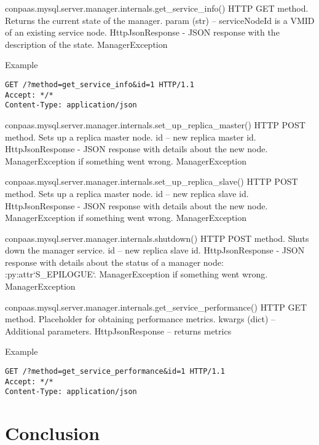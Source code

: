 \documentclass[a4paper,10pt]{article}
\begin{document}
\noindent\conapi
{ conpaas.mysql.server.manager.internals.get\_service\_info()}
{HTTP GET method. Returns the current state of the manager.}
{param (str) -- serviceNodeId is a VMID of an existing service node.}
{HttpJsonResponse - JSON response with the description of the state.}
{ManagerException}

Example
\begin{Verbatim}[frame=single]
GET /?method=get_service_info&id=1 HTTP/1.1
Accept: */*
Content-Type: application/json
\end{Verbatim}

\noindent\conapi
{ conpaas.mysql.server.manager.internals.set\_up\_replica\_master()}
{HTTP POST method. Sets up a replica master node.}
{ id -- new replica master id.}
{HttpJsonResponse - JSON response with details about the new
      node. ManagerException if something went wrong.}
{ManagerException}
     
\noindent\conapi
{ conpaas.mysql.server.manager.internals.set\_up\_replica\_slave()}
{HTTP POST method. Sets up a replica master node.}
{  id -- new replica slave id.}
{ HttpJsonResponse - JSON response with details about the new
      node. ManagerException if something went wrong.}
{ManagerException}


\noindent\conapi
{ conpaas.mysql.server.manager.internals.shutdown()}
{HTTP POST method. Shuts down the manager service.}
{  id -- new replica slave id.}
{ HttpJsonResponse - JSON response with details about the status
      of a manager node: :py:attr`S\_EPILOGUE`. ManagerException if
      something went wrong.}
{ManagerException}

\noindent\conapi
{ conpaas.mysql.server.manager.internals.get\_service\_performance()}
{ HTTP GET method. Placeholder for obtaining performance metrics.}
{ kwargs (dict) -- Additional parameters.}
{HttpJsonResponse -- returns metrics}
{}

Example
\begin{Verbatim}[frame=single]
GET /?method=get_service_performance&id=1 HTTP/1.1
Accept: */*
Content-Type: application/json
\end{Verbatim}

\section{Conclusion}

\newpage
\vspace{4mm}
\end{document}

